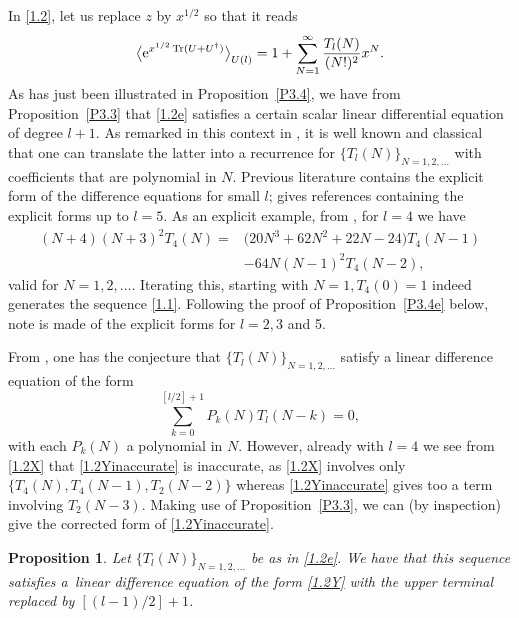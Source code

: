 \documentclass[pdftex]{sigma}
\numberwithin{equation}{section}
\newtheorem{Proposition}[Theorem]{Proposition}
\theoremstyle{definition}
\begin{document}
In \eqref{1.2}, let us replace $z$ by $x^{1/2}$ so that it reads
 \begin{equation}\label{1.2e}
 \big \langle {\rm e}^{x^{1/2} \operatorname{Tr} (U + U^\dagger)} \big \rangle_{U(l)} =
1 + \sum_{N=1}^\infty {T_l(N) \over (N!)^2} x^{N}.
\end{equation}
As has just been illustrated in Proposition~\ref{P3.4}, we have from Proposition~\ref{P3.3} that \eqref{1.2e} satisfies a certain scalar linear differential equation of degree $l+1$.
As remarked in this context in \cite{BG00}, it is well known and classical that one can translate the latter into a recurrence for
$\{ T_l(N) \}_{N=1,2,\dots}$ with coefficients that are polynomial in $N$. Previous literature contains the explicit form of the difference equations for small $l$; \cite[footnote 22]{Bo24} gives references containing the explicit forms up to $l=5$. As an explicit example, from \cite{St07}, for $l=4$ we have
\begin{align}
(N+4)(N+3)^2 T_4(N) ={}& \bigl(20 N^3 + 62 N^2 +22 N - 24\bigr) T_4(N-1)\nonumber
\\& -
64 N (N-1)^2 T_4(N-2),\label{1.2X}
\end{align}
valid for $N=1,2,\dots$.
Iterating this, starting with $N=1, T_4(0) = 1$ indeed generates the sequence \eqref{1.1}. Following the proof of Proposition~\ref{P3.4e} below, note is made of the explicit forms for $l=2,3$ and 5.

From \cite{BFK95}, one has the conjecture that $\{ T_l(N) \}_{N=1,2,\dots}$ satisfy a linear difference equation of the form
\begin{equation}\label{1.2Yinaccurate} %
\sum_{k=0}^{[l/2]+1} P_k(N) T_l(N-k)=0,
\end{equation}
with each $P_k(N)$ a polynomial in $N$. However, already with $l=4$ we see from \eqref{1.2X} that \eqref{1.2Yinaccurate} is inaccurate, as \eqref{1.2X} involves only $\{ T_4(N), T_4(N-1), T_2(N-2) \}$ whereas \eqref{1.2Yinaccurate} gives too a term involving $T_2(N-3)$. Making use of
Proposition~\ref{P3.3}, we can (by inspection) give the corrected form of \eqref{1.2Yinaccurate}.

\begin{Proposition}\label{P3.4d}
 Let $\{ T_l(N) \}_{N=1,2,\dots}$ be as in \eqref{1.2e}. We have
 that this sequence satisfies a~linear difference equation of the form \eqref{1.2Y} with the upper terminal replaced by
 $[(l-1)/2] + 1$.
\end{Proposition}
\end{document}

